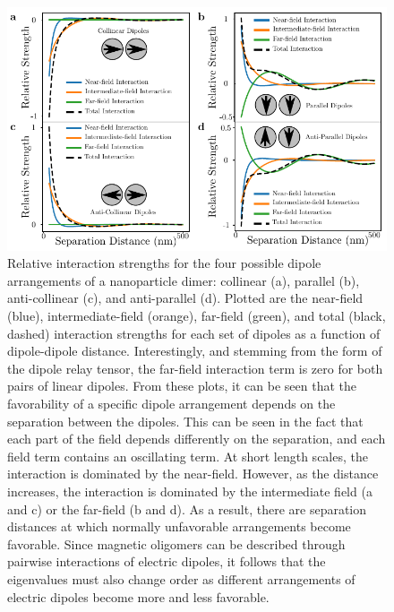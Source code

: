 \documentclass[journal=apchd5,manuscript=article]{achemso}
\begin{document}
\begin{figure}
\centering
\includegraphics{dimer_interaction.pdf}
\caption{Relative interaction strengths for the four possible dipole arrangements of a nanoparticle dimer: collinear (a), parallel (b), anti-collinear (c), and anti-parallel (d). Plotted are the near-field (blue), intermediate-field (orange), far-field (green), and total (black, dashed) interaction strengths for each set of dipoles as a function of dipole-dipole distance. Interestingly, and stemming from the form of the dipole relay tensor, the far-field interaction term is zero for both pairs of linear dipoles. From these plots, it can be seen that the favorability of a specific dipole arrangement depends on the separation between the dipoles. This can be seen in the fact that each part of the field depends differently on the separation, and each field term contains an oscillating term. At short length scales, the interaction is dominated by the near-field. However, as the distance increases, the interaction is dominated by the intermediate field (a and c) or the far-field (b and d). As a result, there are separation distances at which normally unfavorable arrangements become favorable. Since magnetic oligomers can be described through pairwise interactions of electric dipoles, it follows that the eigenvalues must also change order as different arrangements of electric dipoles become more and less favorable.}
\label{dimers}
\end{figure}
\end{document}
